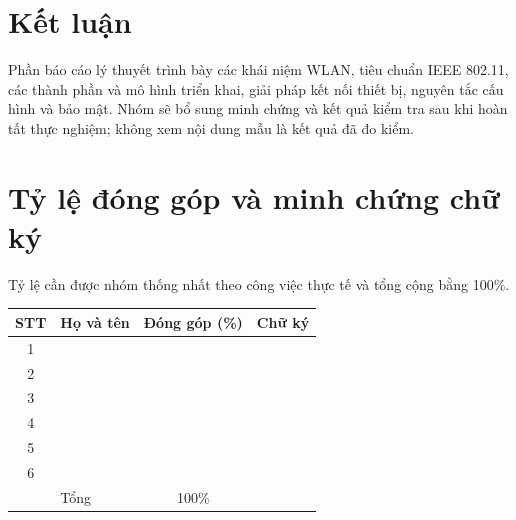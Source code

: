 \documentclass{article}
\begin{document}


\begin{abstract}
  Báo cáo trình bày cơ sở lý thuyết về mạng cục bộ không dây (Wireless Local
  Area Network -- WLAN), gồm các thế hệ Wi-Fi, tiêu chuẩn IEEE 802.11, phổ tần
  và quy hoạch kênh, kiến trúc triển khai, cùng các cơ chế và vấn đề bảo mật.
  Phần thực nghiệm được dành chỗ để nhóm bổ sung sau. Phụ lục cung cấp danh
  sách từ viết tắt và bảng thuật ngữ chuyên ngành Anh--Việt.
\end{abstract}

\tableofcontents
\clearpage
\listoffigures
\listoftables
\clearpage









\section{Kết luận}
Phần báo cáo lý thuyết trình bày các khái niệm WLAN, tiêu chuẩn IEEE 802.11,
các thành phần và mô hình triển khai, giải pháp kết nối thiết bị, nguyên tắc
cấu hình và bảo mật. Nhóm sẽ bổ sung minh chứng và kết quả kiểm tra sau khi
hoàn tất thực nghiệm; không xem nội dung mẫu là kết quả đã đo kiểm.

\clearpage
\renewcommand{\refname}{Tài liệu tham khảo}



\clearpage
\section{Tỷ lệ đóng góp và minh chứng chữ ký}
Tỷ lệ cần được nhóm thống nhất theo công việc thực tế và tổng cộng bằng 100\%.
\begin{center}
\begin{tabularx}{\linewidth}{c X c c}
  \toprule
  STT & Họ và tên & Đóng góp (\%) & Chữ ký \\
  \midrule
  1 & \rule{0pt}{0.8cm} & & \\
  2 & \rule{0pt}{0.8cm} & & \\
  3 & \rule{0pt}{0.8cm} & & \\
  4 & \rule{0pt}{0.8cm} & & \\
  5 & \rule{0pt}{0.8cm} & & \\
  6 & \rule{0pt}{0.8cm} & & \\
  \midrule
  & Tổng & 100\% & \\
  \bottomrule
\end{tabularx}
\end{center}

\clearpage
\appendix

\clearpage

\end{document}
